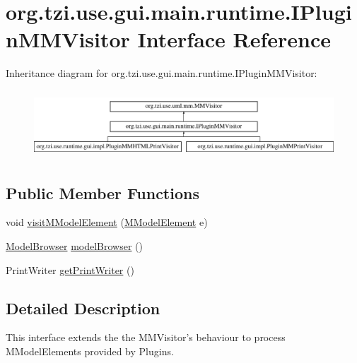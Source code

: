 \hypertarget{interfaceorg_1_1tzi_1_1use_1_1gui_1_1main_1_1runtime_1_1_i_plugin_m_m_visitor}{\section{org.\-tzi.\-use.\-gui.\-main.\-runtime.\-I\-Plugin\-M\-M\-Visitor Interface Reference}
\label{interfaceorg_1_1tzi_1_1use_1_1gui_1_1main_1_1runtime_1_1_i_plugin_m_m_visitor}
}
Inheritance diagram for org.\-tzi.\-use.\-gui.\-main.\-runtime.\-I\-Plugin\-M\-M\-Visitor\-:\begin{figure}[H]
\begin{center}
\leavevmode
\includegraphics[height=2.560976cm]{interfaceorg_1_1tzi_1_1use_1_1gui_1_1main_1_1runtime_1_1_i_plugin_m_m_visitor}
\end{center}
\end{figure}
\subsection*{Public Member Functions}
\begin{DoxyCompactItemize}
\item 
void \hyperlink{interfaceorg_1_1tzi_1_1use_1_1gui_1_1main_1_1runtime_1_1_i_plugin_m_m_visitor_a4a426f6543270da11f1d8b74577f5e02}{visit\-M\-Model\-Element} (\hyperlink{interfaceorg_1_1tzi_1_1use_1_1uml_1_1mm_1_1_m_model_element}{M\-Model\-Element} e)
\item 
\hyperlink{classorg_1_1tzi_1_1use_1_1gui_1_1main_1_1_model_browser}{Model\-Browser} \hyperlink{interfaceorg_1_1tzi_1_1use_1_1gui_1_1main_1_1runtime_1_1_i_plugin_m_m_visitor_ad56d19a4426bf75c65d72972fce696ec}{model\-Browser} ()
\item 
Print\-Writer \hyperlink{interfaceorg_1_1tzi_1_1use_1_1gui_1_1main_1_1runtime_1_1_i_plugin_m_m_visitor_a5b4d55578284be414ec9e474eb9aa6c0}{get\-Print\-Writer} ()
\end{DoxyCompactItemize}


\subsection{Detailed Description}
This interface extends the the M\-M\-Visitor's behaviour to process M\-Model\-Elements provided by Plugins.

